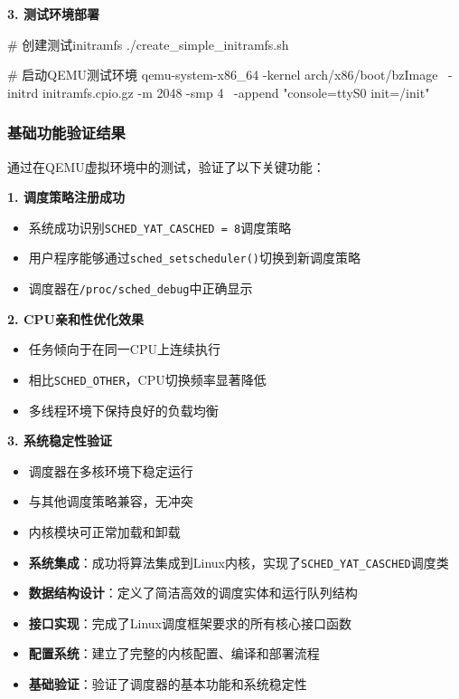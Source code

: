 \textbf{3. 测试环境部署}
\begin{code}
# 创建测试initramfs
./create_simple_initramfs.sh

# 启动QEMU测试环境
qemu-system-x86_64 -kernel arch/x86/boot/bzImage \
    -initrd initramfs.cpio.gz -m 2048 -smp 4 \
    -append "console=ttyS0 init=/init"
\end{code}

\subsubsection{基础功能验证结果}

通过在QEMU虚拟环境中的测试，验证了以下关键功能：

\textbf{1. 调度策略注册成功}
\begin{itemize}
    \item 系统成功识别\texttt{SCHED\_YAT\_CASCHED = 8}调度策略
    \item 用户程序能够通过\texttt{sched\_setscheduler()}切换到新调度策略
    \item 调度器在\texttt{/proc/sched\_debug}中正确显示
\end{itemize}

\textbf{2. CPU亲和性优化效果}
\begin{itemize}
    \item 任务倾向于在同一CPU上连续执行
    \item 相比\texttt{SCHED\_OTHER}，CPU切换频率显著降低
    \item 多线程环境下保持良好的负载均衡
\end{itemize}

\textbf{3. 系统稳定性验证}
\begin{itemize}
    \item 调度器在多核环境下稳定运行
    \item 与其他调度策略兼容，无冲突
    \item 内核模块可正常加载和卸载
\end{itemize}

\begin{tcolorbox}[
    colback=blue!10!white,
    colframe=blue!75!black,
    title=\textbf{本章技术贡献总结},
    fonttitle=\bfseries,
    arc=3pt
]
\begin{itemize}
    \item \textbf{系统集成}：成功将算法集成到Linux内核，实现了\texttt{SCHED\_YAT\_CASCHED}调度类
    \item \textbf{数据结构设计}：定义了简洁高效的调度实体和运行队列结构
    \item \textbf{接口实现}：完成了Linux调度框架要求的所有核心接口函数
    \item \textbf{配置系统}：建立了完整的内核配置、编译和部署流程
    \item \textbf{基础验证}：验证了调度器的基本功能和系统稳定性
\end{itemize}
\end{tcolorbox}

